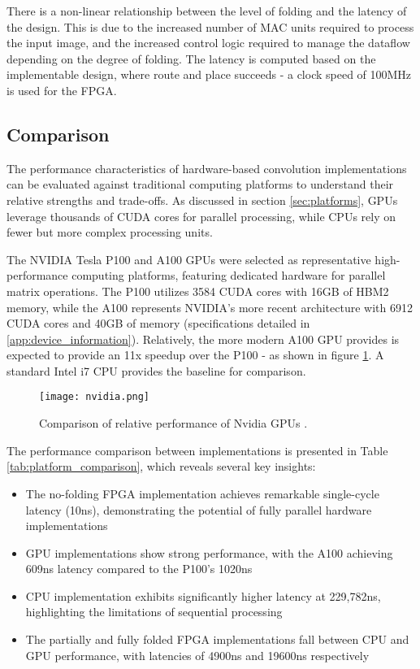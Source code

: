 There is a non-linear relationship between the level of folding and the latency of the design.
This is due to the increased number of MAC units required to process the input image, and the increased control logic required to manage the dataflow depending on the degree of folding.
The latency is computed based on the implementable design, where route and place succeeds - a clock speed of 100MHz is used for the FPGA.


\subsection{Comparison}
The performance characteristics of hardware-based convolution implementations can be evaluated against traditional computing platforms to understand their relative strengths and trade-offs. As discussed in section \ref{sec:platforms}, GPUs leverage thousands of CUDA cores for parallel processing, while CPUs rely on fewer but more complex processing units.

The NVIDIA Tesla P100 and A100 GPUs were selected as representative high-performance computing platforms, featuring dedicated hardware for parallel matrix operations. The P100 utilizes 3584 CUDA cores with 16GB of HBM2 memory, while the A100 represents NVIDIA's more recent architecture with 6912 CUDA cores and 40GB of memory (specifications detailed in \ref{app:device_information}). 
Relatively, the more modern A100 GPU provides is expected to provide an 11x speedup over the P100 - as shown in figure \ref{fig:nvidia}.
A standard Intel i7 CPU provides the baseline for comparison.

\begin{figure}[h]
    \centering
    \texttt{[image: nvidia.png]}
    \caption{Comparison of relative performance of Nvidia GPUs \cite{23}.}
    \label{fig:nvidia}
\end{figure}

The performance comparison between implementations is presented in Table \ref{tab:platform_comparison}, which reveals several key insights:

\begin{itemize}
    \item The no-folding FPGA implementation achieves remarkable single-cycle latency (10ns), demonstrating the potential of fully parallel hardware implementations
    \item GPU implementations show strong performance, with the A100 achieving 609ns latency compared to the P100's 1020ns
    \item CPU implementation exhibits significantly higher latency at 229,782ns, highlighting the limitations of sequential processing
    \item The partially and fully folded FPGA implementations fall between CPU and GPU performance, with latencies of 4900ns and 19600ns respectively
\end{itemize}


